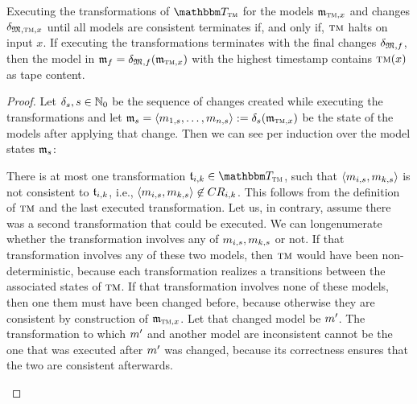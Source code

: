\begin{lemma}
    \label{lemma:turing_machine_construction}
    Executing the transformations of $\transformationset{T}_{\TuringMachine}$ for the models $\mathfrak{m}_{\textsc{tm},x}$ and changes $\mathfrak{\delta}_{\mathfrak{M},\textsc{tm},x}$ until all models are consistent %
    terminates if, and only if, $\textsc{tm}$ halts on input $x$.
	If executing the transformations terminates with the final changes $\mathfrak{\delta}_{\mathfrak{M},f}$, then the model in $\mathfrak{m}_{f} = \mathfrak{\delta}_{\mathfrak{M},f}(\mathfrak{m}_{\textsc{tm},x})$ with the highest timestamp contains $\textsc{tm}(x)$ as tape content.
\end{lemma}
\begin{proof}
    Let $\mathfrak{\delta}_{s}, s \in \mathbb{N}_0$ be the sequence of changes created while executing the transformations and let $\mathfrak{m}_{s} = \langle m_{1,s}, \dots, m_{n,s} \rangle:= \mathfrak{\delta}_{s}(\mathfrak{m}_{\textsc{tm},x})$ be the state of the models after applying that change.
    Then we can see per induction over the model states $\mathfrak{m}_{s}$:
	\begin{longenumerate} %
        \item 
            There is at most one transformation $\transformation{t}_{i,k} \in \transformationset{T}_{\TuringMachine}$, such that $\langle m_{i,s},m_{k,s} \rangle$ is not consistent to $\mathfrak{t}_{i,k}$, i.e., $\langle m_{i,s},m_{k,s} \rangle \not\in CR_{i,k}$.
            This follows from the definition of $\textsc{tm}$ and the last executed transformation.
            Let us, in contrary, assume there was a second transformation that could be executed. 
            We can longenumerate whether the transformation involves any of $m_{i,s},m_{k,s}$ or not.
            If that transformation involves any of these two models, then $\textsc{tm}$ would have been non-deterministic, because each transformation realizes a transitions between the associated states of $\textsc{tm}$.
            If that transformation involves none of these models, then one them must have been changed before, because otherwise they are consistent by construction of $\mathfrak{m}_{\textsc{tm},x}$.
            Let that changed model be $m_{}'$.
            The transformation to which $m_{}'$ and another model are inconsistent cannot be the one that was executed after $m_{}'$ was changed, because its correctness ensures that the two are consistent afterwards.

\end{longenumerate}
\end{proof}
